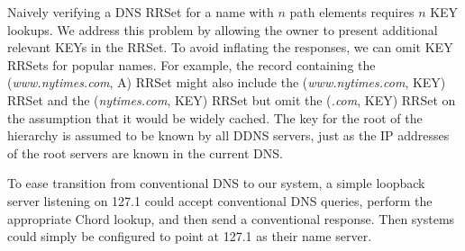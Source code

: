 Naively verifying a DNS RRSet for a name with $n$ 
path elements requires $n$ KEY lookups.
We address this problem by allowing the owner to
present additional relevant KEYs in the RRSet.
To avoid inflating the responses, we can omit KEY RRSets
for popular names.
For example, the record containing the ({\em www.nytimes.com}, A) RRSet
might also include the ({\em www.nytimes.com}, KEY) RRSet 
and the ({\em nytimes.com}, KEY) RRSet but omit
the ({\em .com}, KEY) RRSet on the assumption that
it would be widely cached.
The key for the root of the hierarchy is assumed to be
known by all DDNS servers, just as the IP addresses of the
root servers are known in the current DNS.

To ease transition from conventional DNS to our system,
a simple loopback server listening on 127.1 could accept
conventional DNS queries, perform the appropriate Chord lookup,
and then send a conventional response.
Then systems could simply be configured to 
point at 127.1 as their name server.

